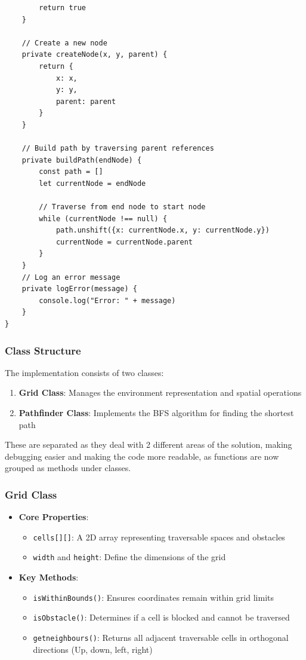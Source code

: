 \begin{verbatim}
        return true
    }
    
    // Create a new node
    private createNode(x, y, parent) {
        return {
            x: x,
            y: y,
            parent: parent
        }
    }
    
    // Build path by traversing parent references
    private buildPath(endNode) {
        const path = []
        let currentNode = endNode
        
        // Traverse from end node to start node
        while (currentNode !== null) {
            path.unshift({x: currentNode.x, y: currentNode.y})
            currentNode = currentNode.parent
        }
    }
    // Log an error message
    private logError(message) {
        console.log("Error: " + message)
    }
}
\end{verbatim}

\subsubsection{Class Structure}
The implementation consists of two classes:
\begin{enumerate}
    \item \textbf{Grid Class}: Manages the environment representation and spatial operations
    \item \textbf{Pathfinder Class}: Implements the BFS algorithm for finding the shortest path
\end{enumerate}

These are separated as they deal with 2 different areas of the solution, making debugging easier and making the code more readable, as functions are now grouped as methods under classes.

\subsubsection{Grid Class}
\begin{itemize}
    \item \textbf{Core Properties}:
    \begin{itemize}
        \item \texttt{cells[][]}: A 2D array representing traversable spaces and obstacles
        \item \texttt{width} and \texttt{height}: Define the dimensions of the grid
    \end{itemize}
    \item \textbf{Key Methods}:
    \begin{itemize}
        \item \texttt{isWithinBounds()}: Ensures coordinates remain within grid limits
        \item \texttt{isObstacle()}: Determines if a cell is blocked and cannot be traversed
        \item \texttt{getneighbours()}: Returns all adjacent traversable cells in orthogonal directions (Up, down, left, right)
    \end{itemize}
\end{itemize}

